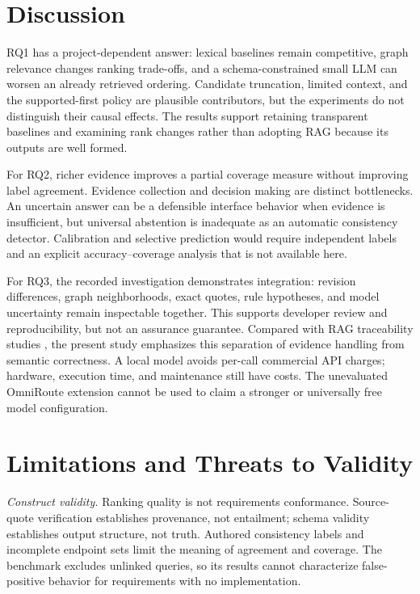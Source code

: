 \documentclass[conference,letterpaper,10pt]{IEEEtran}
\begin{document}
\section{Discussion}
RQ1 has a project-dependent answer: lexical baselines remain competitive, graph relevance changes ranking trade-offs, and a schema-constrained small LLM can worsen an already retrieved ordering. Candidate truncation, limited context, and the supported-first policy are plausible contributors, but the experiments do not distinguish their causal effects. The results support retaining transparent baselines and examining rank changes rather than adopting RAG because its outputs are well formed.

For RQ2, richer evidence improves a partial coverage measure without improving label agreement. Evidence collection and decision making are distinct bottlenecks. An uncertain answer can be a defensible interface behavior when evidence is insufficient, but universal abstention is inadequate as an automatic consistency detector. Calibration and selective prediction would require independent labels and an explicit accuracy--coverage analysis that is not available here.

For RQ3, the recorded investigation demonstrates integration: revision differences, graph neighborhoods, exact quotes, rule hypotheses, and model uncertainty remain inspectable together. This supports developer review and reproducibility, but not an assurance guarantee. Compared with RAG traceability studies \cite{lissa,reqrag,ensemble}, the present study emphasizes this separation of evidence handling from semantic correctness. A local model avoids per-call commercial API charges; hardware, execution time, and maintenance still have costs. The unevaluated OmniRoute extension cannot be used to claim a stronger or universally free model configuration.

\section{Limitations and Threats to Validity}
\textit{Construct validity.} Ranking quality is not requirements conformance. Source-quote verification establishes provenance, not entailment; schema validity establishes output structure, not truth. Authored consistency labels and incomplete endpoint sets limit the meaning of agreement and coverage. The benchmark excludes unlinked queries, so its results cannot characterize false-positive behavior for requirements with no implementation.
\end{document}
